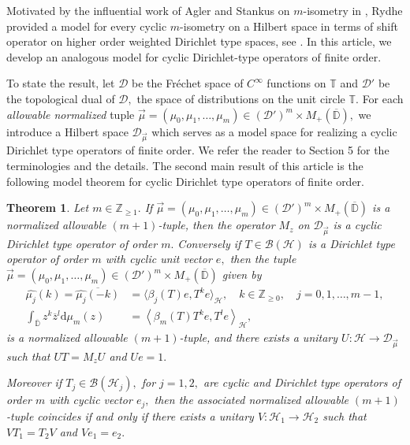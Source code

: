 \documentclass[10pt,oneside,reqno]{amsart}
\newtheorem{theorem}{Theorem}[section]
\theoremstyle{definition}
\theoremstyle{remark}
\newcommand{\calH}{{\mathcal{H}}}
\newcommand{\ip}[1]{\left\langle #1 \right\rangle}
\newcommand{\D}{\mathbb D}
\newcommand{\T}{\mathbb T}
\numberwithin{equation}{section}
\begin{document}
Motivated by the influential work of Agler and Stankus on $m$-isometry in \cite{Agler1,Agler2,Agler3}, Rydhe provided a model for every cyclic $m$-isometry on a Hilbert space in terms of shift operator on higher order weighted Dirichlet type spaces, see \cite[Theorem 3.1]{Rydhe19}. In this article, we develop an analogous model for cyclic Dirichlet-type operators of finite order. 

To state the result, let $\mathcal D$ be the Fr\'{e}chet space of $C^{\infty}$ functions on $\T$ and $\mathcal D'$ be the topological dual of $\mathcal D,$  the space of distributions on the unit circle $\mathbb T.$ For each \textit{allowable normalized} tuple $\overrightarrow{\mu}= (\mu_0,\mu_1,\ldots,\mu_{m})\in (\mathcal D')^{m}\times M_+(\overline{\D}),$ we introduce a  Hilbert space $\mathscr D_{\overrightarrow{\mu}}$ which serves as a model space for realizing a cyclic Dirichlet type operators of finite order. We refer the reader to Section 5 for the terminologies and the details. The second main result of this article is the following model theorem for cyclic Dirichlet type operators of finite order.

\begin{theorem}\label{Model Theorem}
    Let $m\in\mathbb Z_{\geqslant 1}.$ If $\overrightarrow{\mu}= (\mu_0,\mu_1,\ldots,\mu_{m})\in (\mathcal D')^{m}\times M_+(\overline{\D})$ is a normalized allowable $(m+1)$-tuple, then the operator $M_z$ on  $\mathscr D_{\overrightarrow{\mu}}$ is a cyclic Dirichlet type operator of order $m.$ Conversely if $T\in \mathcal B(\mathcal H)$ is a Dirichlet type operator of order $m$ with cyclic unit vector $e,$ then the tuple $\overrightarrow{\mu}= (\mu_0,\mu_1,\ldots,\mu_{m})\in (\mathcal D')^{m}\times M_+(\overline{\D})$ given by 
    \begin{align*}
        \hat{\mu_j}(k)= \overline{\hat{\mu_j}(-k)}&= \langle \beta_j(T)e, T^ke\rangle_{\mathcal H},\quad k\in \mathbb Z_{\geqslant 0} , \quad j=0,1,\ldots,m-1,\\
         \int_{\mathbb{\overline{\D}}} z^{k} \overline{z}^{l} \mathrm{d}\mu_{m} (z) &= \ip{\beta_{m} (T) T^k e, T^l e}_{\calH},
    \end{align*} is a normalized allowable $(m+1)$-tuple, and there exists a unitary $U:\mathcal H \to \mathscr D_{\overrightarrow{\mu}}$ such that $UT=M_zU$ and $Ue=1.$
    
    Moreover if $T_j\in \mathcal B(\mathcal H_j),$ for $j=1,2,$ are cyclic and  Dirichlet type operators of order $m$ with cyclic vector $e_j,$ then the associated normalized allowable $(m+1)$-tuple coincides if and only if there exists a unitary $V:\mathcal H_1\to \mathcal H_2$ such that $VT_1=T_2V$ and $Ve_1=e_2.$ 
\end{theorem}
\end{document}
